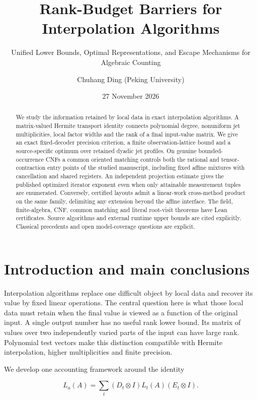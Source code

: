 \documentclass[
  11pt,
]{article}
\title{Rank-Budget Barriers for Interpolation Algorithms}
\subtitle{Unified Lower Bounds, Optimal Representations, and Escape
Mechanisms for Algebraic Counting}
\author{Chuhang Ding (Peking University)}
\date{27 November 2026}
\begin{document}
\maketitle
\begin{abstract}
We study the information retained by local data in exact interpolation
algorithms. A matrix-valued Hermite transport identity connects
polynomial degree, nonuniform jet multiplicities, local factor widths
and the rank of a final input-value matrix. We give an exact
fixed-decoder precision criterion, a finite observation-lattice bound
and a source-specific optimum over retained dyadic jet profiles. On
genuine bounded-occurrence CNFs a common oriented matching controls both
the rational and tensor-contraction entry points of the studied
manuscript, including fixed affine mixtures with cancellation and shared
registers. An independent projection estimate gives the published
optimized iterator exponent even when only attainable measurement tuples
are enumerated. Conversely, certified layouts admit a linear-work
cross-method product on the same family, delimiting any extension beyond
the affine interface. The field, finite-algebra, CNF, common matching and literal root-visit theorems have Lean certificates. Source algorithms and external runtime upper bounds are cited explicitly. Classical precedents
and open model-coverage questions are explicit.
\end{abstract}

{
\hypersetup{linkcolor=}
\setcounter{tocdepth}{2}
\tableofcontents
}
\section{Introduction and main
conclusions}\label{introduction-and-main-conclusions}

Interpolation algorithms replace one difficult object by local data and
recover its value by fixed linear operations. The central question here
is what those local data must retain when the final value is viewed as a
function of the original input. A single output number has no useful
rank lower bound. Its matrix of values over two independently varied
parts of the input can have large rank. Polynomial test vectors make
this distinction compatible with Hermite interpolation, higher
multiplicities and finite precision.

We develop one accounting framework around the identity

\[
 L_a(A)=\sum_t(D_t\otimes I)L_t(A)(E_t\otimes I).
 \tag{U.1}
\]
\end{document}
